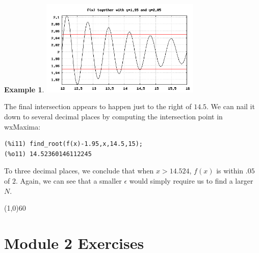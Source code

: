 \documentclass[10.5pt,twoside]{report}
\theoremstyle{definition}
\newtheorem{exmp}{Example}[section]
\begin{document}
\begin{exmp}
\includegraphics[width=3in]{example_3_3_2_2}

The final intersection appears to happen just to the right of $14.5$. We can nail it down to several decimal places by computing the intersection point in wxMaxima:

\begin{verbatim}
(%i11) find_root(f(x)-1.95,x,14.5,15);
(%o11) 14.52360146112245
\end{verbatim} 

To three decimal places, we conclude that when $x>14.524$, $f(x)$ is within $.05$ of $2$.  Again, we can see that a smaller $\epsilon$ would simply require us to find a larger $N$.

\end{exmp}

\line(1,0){60}
\linethickness{0.5mm}

\pagebreak

\section{Module 2 Exercises}\label{Module 2 Exercises}
\end{document}
